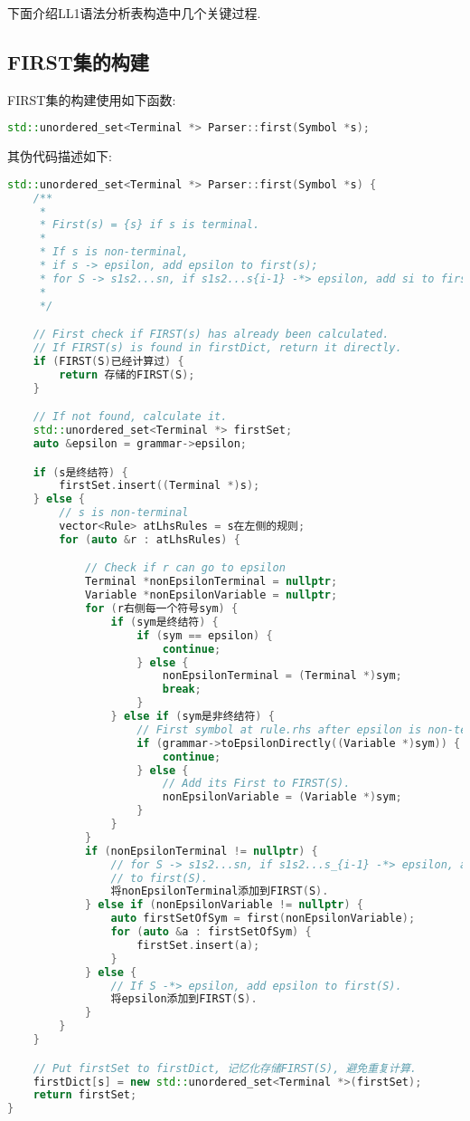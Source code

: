 下面介绍LL1语法分析表构造中几个关键过程.
\subsection{FIRST集的构建}
FIRST集的构建使用如下函数:
\begin{lstlisting}[language=c++]
std::unordered_set<Terminal *> Parser::first(Symbol *s);
\end{lstlisting}

其伪代码描述如下:
\begin{lstlisting}[language=c++]
std::unordered_set<Terminal *> Parser::first(Symbol *s) {
    /**
     *
     * First(s) = {s} if s is terminal.
     *
     * If s is non-terminal,
     * if s -> epsilon, add epsilon to first(s);
     * for S -> s1s2...sn, if s1s2...s{i-1} -*> epsilon, add si to first(S).
     *
     */

    // First check if FIRST(s) has already been calculated.
    // If FIRST(s) is found in firstDict, return it directly.
    if (FIRST(S)已经计算过) {
        return 存储的FIRST(S);
    }

    // If not found, calculate it.
    std::unordered_set<Terminal *> firstSet;
    auto &epsilon = grammar->epsilon;

    if (s是终结符) {
        firstSet.insert((Terminal *)s);
    } else {
        // s is non-terminal
        vector<Rule> atLhsRules = s在左侧的规则;
        for (auto &r : atLhsRules) {

            // Check if r can go to epsilon
            Terminal *nonEpsilonTerminal = nullptr;
            Variable *nonEpsilonVariable = nullptr;
            for (r右侧每一个符号sym) {
                if (sym是终结符) {
                    if (sym == epsilon) {
                        continue;
                    } else {
                        nonEpsilonTerminal = (Terminal *)sym;
                        break;
                    }
                } else if (sym是非终结符) {
                    // First symbol at rule.rhs after epsilon is non-terminal.
                    if (grammar->toEpsilonDirectly((Variable *)sym)) {
                        continue;
                    } else {
                        // Add its First to FIRST(S).
                        nonEpsilonVariable = (Variable *)sym;
                    }
                }
            }
            if (nonEpsilonTerminal != nullptr) {
                // for S -> s1s2...sn, if s1s2...s_{i-1} -*> epsilon, add si
                // to first(S).
                将nonEpsilonTerminal添加到FIRST(S).
            } else if (nonEpsilonVariable != nullptr) {
                auto firstSetOfSym = first(nonEpsilonVariable);
                for (auto &a : firstSetOfSym) {
                    firstSet.insert(a);
                }
            } else {
                // If S -*> epsilon, add epsilon to first(S).
                将epsilon添加到FIRST(S).
            }
        }
    }

    // Put firstSet to firstDict, 记忆化存储FIRST(S), 避免重复计算.
    firstDict[s] = new std::unordered_set<Terminal *>(firstSet);
    return firstSet;
}
\end{lstlisting}
